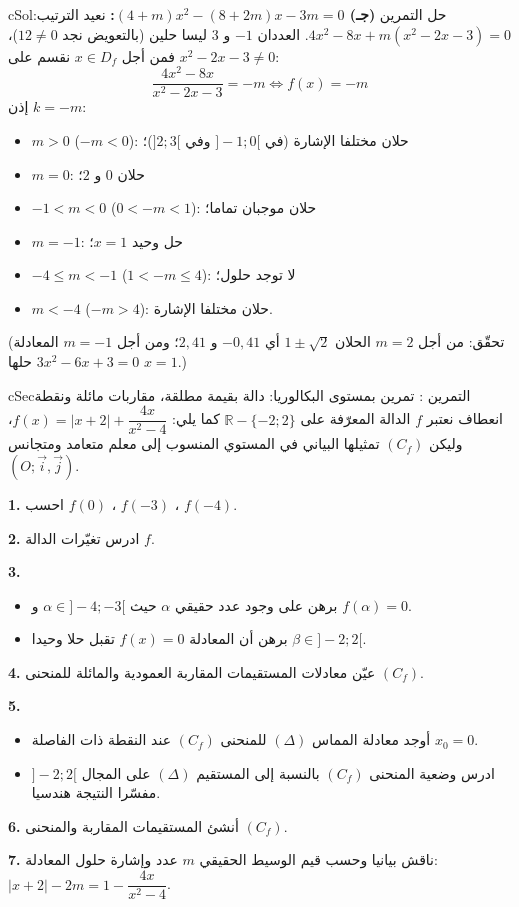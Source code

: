 \documentclass[12pt,a4paper]{article}
\newenvironment{BOX}[2]{\begin{otherlanguage}{english}\begin{arbox}{#1}{#2}}{\end{arbox}\end{otherlanguage}}
\newcounter{exo}
\newenvironment{tamrin}[1]{\stepcounter{exo}\begin{BOX}{cSec}{التمرين \theexo: #1}}{\end{BOX}}
\newenvironment{hal}{\Needspace{12\baselineskip}\begin{otherlanguage}{english}\begin{arbox}[breakable]{cSol}{حل التمرين \theexo}}{\end{arbox}\end{otherlanguage}}
\newcommand{\R}{\mathbb{R}}
\newenvironment{sq}{\begin{itemize}[leftmargin=2.4em,itemsep=3pt]}{\end{itemize}}
\newcommand{\qa}{\item[(أ)]}\newcommand{\qb}{\item[(ب)]}\newcommand{\qc}{\item[(جـ)]}\newcommand{\qd}{\item[(د)]}\newcommand{\qe}{\item[(هـ)]}
\newcommand{\QQ}[1]{\par\smallskip\textbf{#1.} }
\begin{document}
\begin{hal}
\textbf{(جـ) $(4+m)x^{2}-(8+2m)x-3m=0$:} نعيد الترتيب: $4x^{2}-8x+m(x^{2}-2x-3)=0$. العددان $-1$ و $3$ ليسا حلين (بالتعويض نجد $12\neq0$)، فمن أجل $x\in D_f$ نقسم على $x^{2}-2x-3\neq0$:
\[\frac{4x^{2}-8x}{x^{2}-2x-3}=-m\iff f(x)=-m\]
إذن $k=-m$:
\begin{itemize}
\item $m>0$ ($-m<0$): حلان مختلفا الإشارة (في $]-1;0[$ وفي $]2;3[$)؛
\item $m=0$: حلان $0$ و $2$؛
\item $-1<m<0$ ($0<-m<1$): حلان موجبان تماما؛
\item $m=-1$: حل وحيد $x=1$؛
\item $-4\leqslant m<-1$ ($1<-m\leqslant4$): لا توجد حلول؛
\item $m<-4$ ($-m>4$): حلان مختلفا الإشارة.
\end{itemize}
(تحقّق: من أجل $m=2$ الحلان $1\pm\sqrt2$ أي $-0{,}41$ و $2{,}41$؛ ومن أجل $m=-1$ المعادلة $3x^{2}-6x+3=0$ حلها $x=1$.)
\end{hal}

\begin{tamrin}{تمرين بمستوى البكالوريا: دالة بقيمة مطلقة، مقاربات مائلة ونقطة انعطاف}
نعتبر $f$ الدالة المعرّفة على $\R-\{-2;2\}$ كما يلي: $f(x)=|x+2|+\dfrac{4x}{x^{2}-4}$، وليكن $(C_f)$ تمثيلها البياني في المستوي المنسوب إلى معلم متعامد ومتجانس $(O;\vec i,\vec j)$.
\QQ{1} احسب $f(0)$ ، $f(-3)$ ، $f(-4)$.
\QQ{2} ادرس تغيّرات الدالة $f$.
\QQ{3}
\begin{sq}
\qa برهن على وجود عدد حقيقي $\alpha$ حيث $\alpha\in]-4;-3[$ و $f(\alpha)=0$.
\qb برهن أن المعادلة $f(x)=0$ تقبل حلا وحيدا $\beta\in]-2;2[$.
\end{sq}
\QQ{4} عيّن معادلات المستقيمات المقاربة العمودية والمائلة للمنحنى $(C_f)$.
\QQ{5}
\begin{sq}
\qa أوجد معادلة المماس $(\Delta)$ للمنحنى $(C_f)$ عند النقطة ذات الفاصلة $x_0=0$.
\qb ادرس وضعية المنحنى $(C_f)$ بالنسبة إلى المستقيم $(\Delta)$ على المجال $]-2;2[$ مفسّرا النتيجة هندسيا.
\end{sq}
\QQ{6} أنشئ المستقيمات المقاربة والمنحنى $(C_f)$.
\QQ{7} ناقش بيانيا وحسب قيم الوسيط الحقيقي $m$ عدد وإشارة حلول المعادلة: \ $|x+2|-2m=1-\dfrac{4x}{x^{2}-4}$.
\end{tamrin}
\end{document}

